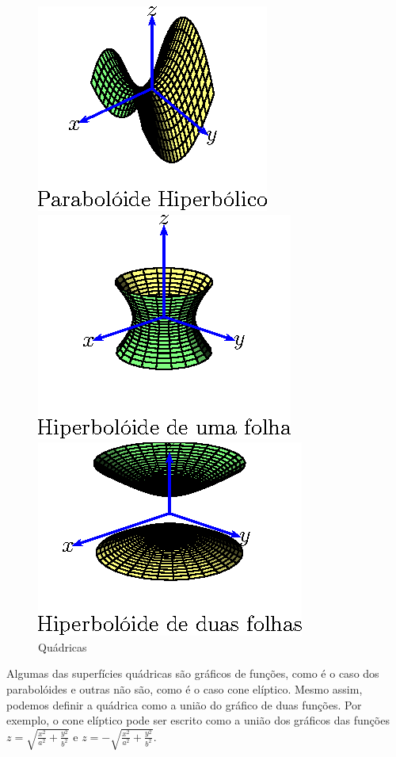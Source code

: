 \begin{ex}
\begin{figure}[htp]
\begin{minipage}{5cm}
\includegraphics{cap_superficies/figs/figura_5}
\end{minipage}\begin{minipage}{5cm}
\includegraphics{cap_superficies/figs/figura_6}
\end{minipage}\begin{minipage}{5cm}
\includegraphics{cap_superficies/figs/figura_7}
\end{minipage}
\caption{\label{quadricas}Quádricas}
\end{figure}

Algumas das superfícies quádricas são gráficos de funções, como é o caso dos parabolóides e outras não são, como é o caso cone elíptico. Mesmo assim, podemos definir a quádrica como a união do gráfico de duas funções. Por exemplo, o cone elíptico pode ser escrito como a união dos gráficos das funções $z=\sqrt{\frac{x^2}{a^2}+\frac{y^2}{b^2}}$ e $z=-\sqrt{\frac{x^2}{a^2}+\frac{y^2}{b^2}}$.
\end{ex}

